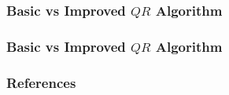 \documentclass{beamer}
\begin{document}
\begin{frame}
	\frametitle{Basic vs Improved $QR$ Algorithm}
	\begin{center}
		\resizebox{0.8\textwidth}{!}{}
	\end{center}
\end{frame}

\begin{frame}
	\frametitle{Basic vs Improved $QR$ Algorithm}
	\begin{center}
		\resizebox{0.8\textwidth}{!}{}
	\end{center}
\end{frame}

\begin{frame}
	\frametitle{References}
	\printbibliography
\end{frame}
\end{document}
